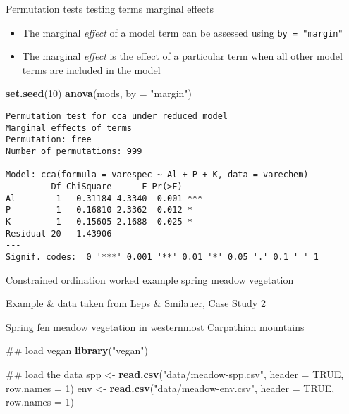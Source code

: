 \documentclass[10pt,ignorenonframetext,compress, aspectratio=169]{beamer}
\newenvironment{Shaded}{\begin{snugshade}}{\end{snugshade}}
\newcommand{\KeywordTok}[1]{\textcolor[rgb]{0.13,0.29,0.53}{\textbf{{#1}}}}
\newcommand{\DataTypeTok}[1]{\textcolor[rgb]{0.13,0.29,0.53}{{#1}}}
\newcommand{\DecValTok}[1]{\textcolor[rgb]{0.00,0.00,0.81}{{#1}}}
\newcommand{\StringTok}[1]{\textcolor[rgb]{0.31,0.60,0.02}{{#1}}}
\newcommand{\OtherTok}[1]{\textcolor[rgb]{0.56,0.35,0.01}{{#1}}}
\newcommand{\NormalTok}[1]{{#1}}
\begin{document}
\begin{frame}[fragile]{Permutation tests \textbar{} testing terms
marginal effects}

\begin{itemize}
\itemsep1pt\parskip0pt
\item
  The marginal \emph{effect} of a model term can be assessed using
  \texttt{by\ =\ "margin"}
\item
  The marginal \emph{effect} is the effect of a particular term when all
  other model terms are included in the model
\end{itemize}

\tiny

\begin{Shaded}
\begin{Highlighting}[]
\KeywordTok{set.seed}\NormalTok{(}\DecValTok{10}\NormalTok{)}
\KeywordTok{anova}\NormalTok{(mods, }\DataTypeTok{by =} \StringTok{"margin"}\NormalTok{)}
\end{Highlighting}
\end{Shaded}

\begin{verbatim}
Permutation test for cca under reduced model
Marginal effects of terms
Permutation: free
Number of permutations: 999

Model: cca(formula = varespec ~ Al + P + K, data = varechem)
         Df ChiSquare      F Pr(>F)    
Al        1   0.31184 4.3340  0.001 ***
P         1   0.16810 2.3362  0.012 *  
K         1   0.15605 2.1688  0.025 *  
Residual 20   1.43906                  
---
Signif. codes:  0 '***' 0.001 '**' 0.01 '*' 0.05 '.' 0.1 ' ' 1
\end{verbatim}

\normalsize

\end{frame}

\begin{frame}[fragile]{Constrained ordination worked example \textbar{}
spring meadow vegetation}

Example \& data taken from Leps \& Smilauer, Case Study 2

Spring fen meadow vegetation in westernmost Carpathian mountains

\scriptsize

\begin{Shaded}
\begin{Highlighting}[]
\NormalTok{## load vegan}
\KeywordTok{library}\NormalTok{(}\StringTok{"vegan"}\NormalTok{)}

\NormalTok{## load the data}
\NormalTok{spp <-}\StringTok{ }\KeywordTok{read.csv}\NormalTok{(}\StringTok{"data/meadow-spp.csv"}\NormalTok{, }\DataTypeTok{header =} \OtherTok{TRUE}\NormalTok{, }\DataTypeTok{row.names =} \DecValTok{1}\NormalTok{)}
\NormalTok{env <-}\StringTok{ }\KeywordTok{read.csv}\NormalTok{(}\StringTok{"data/meadow-env.csv"}\NormalTok{, }\DataTypeTok{header =} \OtherTok{TRUE}\NormalTok{, }\DataTypeTok{row.names =} \DecValTok{1}\NormalTok{)}
\end{Highlighting}
\end{Shaded}

\normalsize

\end{frame}
\end{document}
